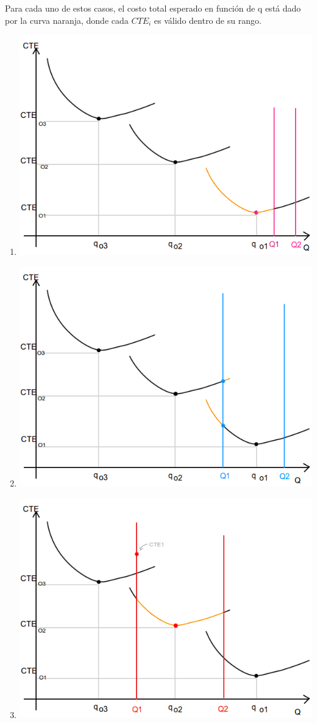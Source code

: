 \documentclass{article}
\begin{document}
Para cada uno de estos casos, el costo total esperado en función de q está dado por la curva naranja, donde cada $CTE_i$ es válido dentro de su rango. 
\begin{enumerate}
 \item \includegraphics[scale=0.4,keepaspectratio=true]{img/7/7_QvsCTE_1B.png} 
 \item \includegraphics[scale=0.4,keepaspectratio=true]{img/7/7_QvsCTE_2B.png} 
 \item \includegraphics[scale=0.4,keepaspectratio=true]{img/7/7_QvsCTE_3B.png} 

\end{enumerate}
\end{document}
